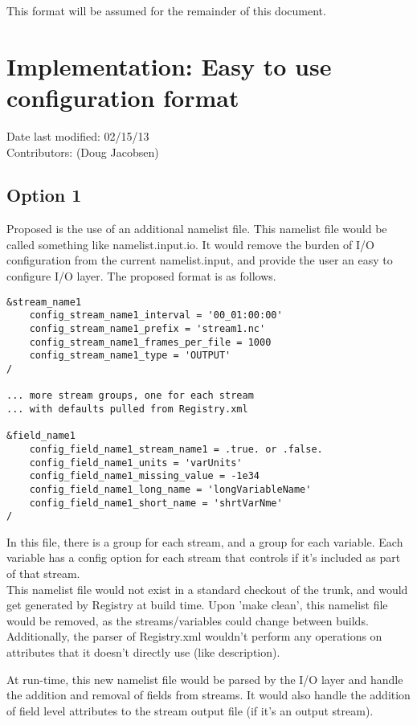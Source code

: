 \documentclass[11pt]{report}
\begin{document}
This format will be assumed for the remainder of this document.

\section{Implementation: Easy to use configuration format}
Date last modified: 02/15/13 \\
Contributors: (Doug Jacobsen) \\

\subsection{Option 1}
Proposed is the use of an additional namelist file. This namelist file would be
called something like namelist.input.io. It would remove the burden of I/O
configuration from the current namelist.input, and provide the user an easy to
configure I/O layer. The proposed format is as follows.

{\small
\begin{lstlisting}
&stream_name1
	config_stream_name1_interval = '00_01:00:00'
	config_stream_name1_prefix = 'stream1.nc'
	config_stream_name1_frames_per_file = 1000
	config_stream_name1_type = 'OUTPUT'
/

... more stream groups, one for each stream
...	with defaults pulled from Registry.xml

&field_name1
	config_field_name1_stream_name1 = .true. or .false.
	config_field_name1_units = 'varUnits'
	config_field_name1_missing_value = -1e34
	config_field_name1_long_name = 'longVariableName'
	config_field_name1_short_name = 'shrtVarNme'
/
\end{lstlisting}
}

In this file, there is a group for each stream, and a group for each variable.
Each variable has a config option for each stream that controls if it's
included as part of that stream. \\

This namelist file would not exist in a standard checkout of the trunk, and
would get generated by Registry at build time. Upon 'make clean', this
namelist file would be removed, as the streams/variables could change between
builds. \\

Additionally, the parser of Registry.xml wouldn't perform any operations on
attributes that it doesn't directly use (like description).

At run-time, this new namelist file would be parsed by the I/O layer and handle
the addition and removal of fields from streams. It would also handle the
addition of field level attributes to the stream output file (if it's an output
stream).
\end{document}
